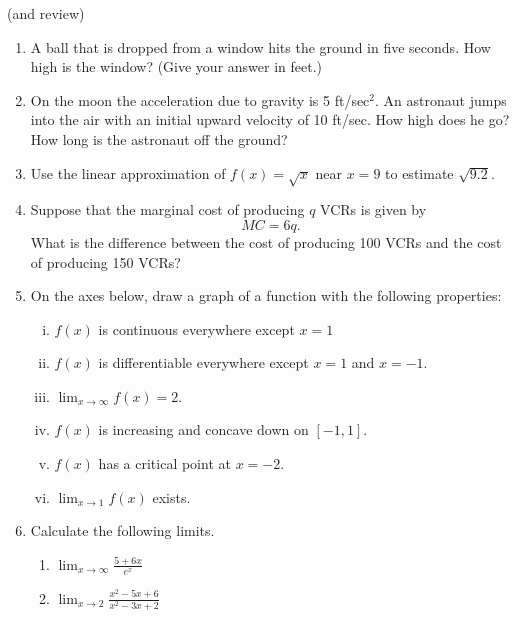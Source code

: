 \documentclass[11pt]{article}
\newcommand{\ds}{\displaystyle}
\begin{document}
\drawtitle

\vspace{-.55in}

\hfill {\tiny(and review)}

\vspace{.1in}

\begin{enumerate}
\item A ball that is dropped from a window hits the ground in five
  seconds. How high is the window? (Give your answer in feet.)

  \vfill
  
\item On the moon the acceleration due to gravity is 5 ft/sec$^2$.  An
  astronaut jumps into the air with an initial upward velocity of 10
  ft/sec.  How high does he go? How long is the astronaut off the
  ground?

  \vfill

  \newpage

\item Use the linear approximation of $f(x)=\sqrt{x}$ near $x=9$ to
  estimate $\sqrt{9.2}$.

  \vfill

\item Suppose that the marginal cost of producing $q$ VCRs is given by
  \[
  MC = 6q.
  \]
  What is the difference between the cost of producing 100 VCRs and
  the cost of producing 150 VCRs?
  \vfill

  \newpage

\item On the axes below, draw a graph of a function with the following
  properties:
  \begin{multicols}{2}
    \begin{enumerate}[(i)]
    \item $f(x)$ is continuous everywhere except $x=1$
    \item $f(x)$ is differentiable everywhere except $x=1$ and $x=-1$.
    \item $\ds\lim_{x\to\infty} f(x) = 2$.
    \item $f(x)$ is increasing and concave down on $[-1,1]$.
    \item $f(x)$ has a critical point at $x=-2$.
    \item $\ds\lim_{x\to 1} f(x)$ exists.
    \end{enumerate}
  \end{multicols}
  \begin{center}
  \end{center}
\item Calculate the following limits.
  \begin{enumerate}
  \item $\ds\lim_{x\to \infty}\frac{5+6x}{e^x}$ \vfill
  \item $\ds\lim_{x\to 2}\frac{x^2-5x+6}{x^2-3x+2}$ \vfill
  \end{enumerate}


\end{enumerate}
\end{document}
